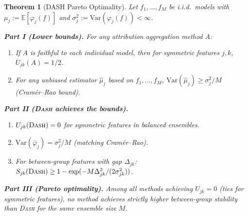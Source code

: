 \documentclass{article}
\newtheorem{theorem}{Theorem}
\newcommand{\E}{\mathbb{E}}
\newcommand{\Var}{\mathrm{Var}}
\newcommand{\DASH}{\textsc{Dash}}
\begin{document}
\begin{theorem}[DASH Pareto Optimality]
\label{thm:dash-optimal}
Let $f_1, \ldots, f_M$ be i.i.d.\ models with $\mu_j := \E[\varphi_j(f)]$ and $\sigma_j^2 := \Var(\varphi_j(f)) < \infty$.

\textbf{Part I (Lower bounds).}
For any attribution aggregation method $A$:
\begin{enumerate}
    \item[(a)] If $A$ is faithful to each individual model, then for symmetric features $j, k$, $U_{jk}(A) = 1/2$.
    \item[(b)] For any unbiased estimator $\hat\mu_j$ based on $f_1, \ldots, f_M$, $\Var(\hat\mu_j) \geq \sigma_j^2 / M$ (Cram\'er--Rao bound).
\end{enumerate}

\textbf{Part II (\DASH{} achieves the bounds).}
\begin{enumerate}
    \item[(c)] $U_{jk}(\text{\DASH{}}) = 0$ for symmetric features in balanced ensembles.
    \item[(d)] $\Var(\bar\varphi_j) = \sigma_j^2 / M$ (matching Cram\'er--Rao).
    \item[(e)] For between-group features with gap $\Delta_{jk}$: $S_{jk}(\text{\DASH{}}) \geq 1 - \exp(-M\Delta_{jk}^2 / (2\sigma_{jk}^2))$.
\end{enumerate}

\textbf{Part III (Pareto optimality).}
Among all methods achieving $U_{jk} = 0$ (ties for symmetric features), no method achieves strictly higher between-group stability than \DASH{} for the same ensemble size $M$.
\end{theorem}
\end{document}
